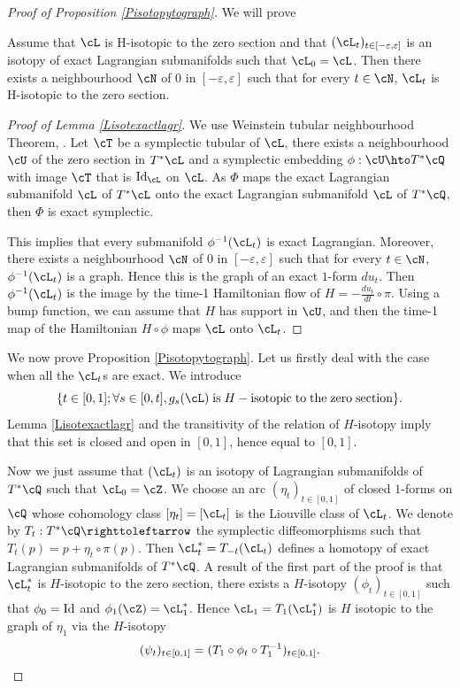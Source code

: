 \begin{proof}[Proof of Proposition \ref{Pisotopytograph}]
We will prove
\begin{lemma}\label{Lisotexactlagr}
Assume that $\cL$ is H-isotopic to the zero section and that $(\cL_t)_{t\in[-\varepsilon, \varepsilon]}$ is an isotopy of exact Lagrangian submanifolds such that $\cL_0=\cL$. Then there exists a neighbourhood $\cN$ of $0$ in $[-\varepsilon, \varepsilon]$ such that for every $t\in\cN$, $\cL_t$ is H-isotopic to the zero section.
\end{lemma}

\begin{proof}[Proof of Lemma \ref{Lisotexactlagr}]
We use Weinstein tubular neighbourhood Theorem, \cite{Weinstein1977}. Let $\cT$ be a symplectic tubular of $\cL$, \ie there exists a neighbourhood $\cU$ of the zero section in $T^*\cL$ and a symplectic embedding $\phi:\cU \hto T^*\cQ$ with image $\cT$ that is ${\rm Id}_{\cL}$ on $\cL$. As $\Phi$ maps the exact Lagrangian submanifold $\cL$ of $T^*\cL$ onto the exact Lagrangian submanifold $\cL$ of $T^*\cQ$, then $\Phi$ is exact symplectic.

This implies that every submanifold $\phi^{-1}(\cL_t)$ is exact Lagrangian. Moreover, there exists a neighbourhood $\cN$ of $0$ in $[-\varepsilon, \varepsilon]$ such that for every $t\in\cN$, $\phi^{-1}(\cL_t)$ is a graph. Hence this is the graph of an exact $1$-form $du_t$. Then $\phi^{-1}(\cL_t)$ is the image by the time-1 Hamiltonian flow of $H=-\frac{du_t}{dt}\circ \pi$. Using a bump function, we can assume that $H$ has support in $\cU$, and then the time-1 map of the Hamiltonian $H\circ\phi$ maps $\cL$ onto $\cL_t$.
\end{proof}

We now prove Proposition \ref{Pisotopytograph}. Let us firstly deal with the case when all the $\cL_t$s are exact. We introduce
\[
\{ t\in[0, 1]; \forall s\in [0, t], g_s(\cL)\;{\rm is}\; H-{\rm isotopic}\;{\rm to}\;{\rm the}\;{\rm zero}\;{\rm section}\}.
\]
Lemma \ref{Lisotexactlagr} and the transitivity of the relation of $H$-isotopy imply that this set is closed and open in $[0, 1]$, hence equal to $[0,1]$.

Now we just assume that $(\cL_t)$ is an isotopy of Lagrangian submanifolds of $T^*\cQ$ such that $\cL_0=\cZ$. We choose an arc $(\eta_t)_{t\in[0,1]}$ of closed $1$-forms on $\cQ$ whose cohomology class $[\eta_t]=[\cL_t]$ is the Liouville class of $\cL_t$. We denote by $T_t:T^*\cQ\righttoleftarrow$ the symplectic diffeomorphisms such that $T_t(p)=p+\eta_t\circ\pi (p)$. Then $\cL^*_t=T_{-t}(\cL_t)$ defines a homotopy of exact Lagrangian submanifolds of $T^*\cQ$. A result of the first part of the proof is that $\cL^*_t$ is $H$-isotopic to the zero section, \ie there exists a $H$-isotopy $(\phi_t)_{t\in[0, 1]}$ such that $\phi_0={\rm Id}$ and $\phi_1(\cZ)=\cL^*_1$. Hence $\cL_1=T_1(\cL^*_1)$ is $H$ isotopic to the graph of $\eta_1$ via the $H$-isotopy
\[
(\psi_t)_{t\in[0,1]}=(T_1\circ \phi_t\circ T_1^{-1})_{t\in[0, 1]}.\qedhere
\]
\end{proof}


